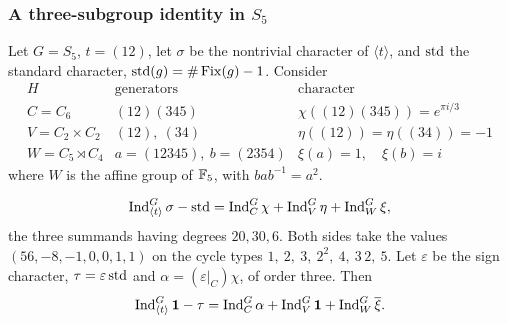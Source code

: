 \subsubsection{A three-subgroup identity in \texorpdfstring{$S_5$}{S5}}\label{grp:sec:s5}
Let $G=S_5$, $t=(12)$, let $\sigma$ be the nontrivial character of
$\langle t\rangle$, and $\mathrm{std}$ the standard character,
$\mathrm{std}(g)=\#\operatorname{Fix}(g)-1$. Consider
\[
\begin{array}{c|c|c}
H&\text{generators}&\text{character}\\ \hline
C=C_6 &(12)(345)&\chi((12)(345))=e^{\pi i/3}\\
V=C_2\times C_2 &(12),\ (34)&\eta((12))=\eta((34))=-1\\
W=C_5\rtimes C_4 &a=(12345),\ b=(2354)&\xi(a)=1,\quad\xi(b)=i
\end{array}
\]
where $W$ is the affine group of $\mathbb{F}_5$, with $bab^{-1}=a^2$.

\begin{theorem}\label{grp:thm:s5-identity}
\begin{equation}\label{grp:eq:s5-identity}
 \operatorname{Ind}_{\langle t\rangle}^{G}\sigma-\mathrm{std}
 =\operatorname{Ind}_{C}^{G}\chi+\operatorname{Ind}_{V}^{G}\eta+\operatorname{Ind}_{W}^{G}\xi ,
\end{equation}
the three summands having degrees $20,30,6$. Both sides take the values
$(56,-8,-1,0,0,1,1)$ on the cycle types $1,\ 2,\ 3,\ 2^2,\ 4,\ 3\,2,\ 5$.
Let $\varepsilon$ be the sign character, $\tau=\varepsilon\,\mathrm{std}$ and
$\alpha=(\varepsilon|_C)\chi$, of order three. Then
\begin{equation}\label{grp:eq:s5-twisted}
 \operatorname{Ind}_{\langle t\rangle}^{G}\mathbf{1}-\tau
 =\operatorname{Ind}_{C}^{G}\alpha+\operatorname{Ind}_{V}^{G}\mathbf{1}+\operatorname{Ind}_{W}^{G}\overline\xi .
\end{equation}
\end{theorem}

